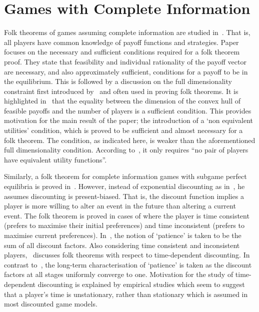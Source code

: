 \section{Games with Complete Information}\label{sec:Games_with_Complete_Information}
Folk theorems of games assuming complete information are studied
in~\cite{Abreu1994, Bernergard2019}. That is, all players have common knowledge
of payoff functions and strategies. Paper~\cite{Abreu1994} focuses on the
necessary and sufficient conditions required for a folk theorem proof. They
state that feasibility and individual rationality of the payoff vector are
necessary, and also approximately sufficient, conditions for a payoff to be in
the equilibrium. This is followed by a discussion on the full dimensionality
constraint first introduced by~\cite{Fudenberg1986} and often used in proving
folk theorems. It is highlighted in~\cite{Abreu1994} that the equality between
the dimension of the convex hull of feasible payoffs and the number
of players is a sufficient condition. This provides motivation for the main result of the paper; the
introduction of a `non equivalent utilities' condition, which is proved to be
sufficient and almost necessary for a folk theorem. The condition, as indicated
here, is weaker than the aforementioned full dimensionality condition. According
to~\cite{Abreu1994}, it only requires ``no pair of players have equivalent utility functions''.

Similarly, a folk theorem for complete information
games with subgame perfect equilibria is proved in~\cite{Bernergard2019}. However, instead of exponential
discounting as in~\cite{Abreu1994, Fudenberg1986}, he assumes discounting is
present-biased. That is, the discount function implies a player is more willing
to alter an event in the future than altering a current event. The folk theorem
is proved in cases of where the player is time consistent (prefers to maximise
their initial preferences) and time inconsistent (prefers to maximise current
preferences). In~\cite{Bernergard2019}, the notion of `patience' is taken to be the sum of all discount
factors. Also considering time consistent and inconsistent
players,~\cite{Li2019} discusses folk theorems with respect to time-dependent
discounting. In contrast
to~\cite{Bernergard2019}, the long-term characterisation of `patience' is taken
as the discount factors at all stages uniformly converge to one. Motivation for
the study of time-dependent discounting is explained by empirical studies which
seem to suggest that a player's time is unstationary, rather than stationary
which is assumed in most discounted game models.


